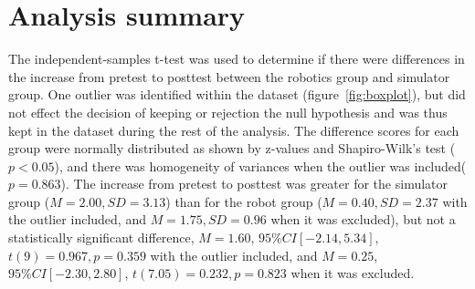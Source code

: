 \section{Analysis summary}
The independent-samples t-test was used to determine if there were differences in the increase from pretest to posttest between the robotics group and simulator group. One outlier was identified within the dataset (figure~\ref{fig:boxplot}), but did not effect the decision of keeping or rejection the null hypothesis and was thus kept in the dataset during the rest of the analysis. The difference scores for each group were normally distributed as shown by z-values and Shapiro-Wilk's test ($p < 0.05$), and there was homogeneity of variances when the outlier was included($p = 0.863$). The increase from pretest to posttest was greater for the simulator group ($M = 2.00, SD = 3.13$) than for the robot group ($M = 0.40, SD = 2.37$ with the outlier included, and $M=1.75, SD = 0.96$ when it was excluded), but not a statistically significant difference, $M = 1.60$, $95\% CI [-2.14, 5.34]$, $t(9) = 0.967, p = 0.359$ with the outlier included, and $M = 0.25$, $95\% CI [-2.30, 2.80]$, $t(7.05) = 0.232, p = 0.823$ when it was excluded.

\bigskip\noindent
{}
